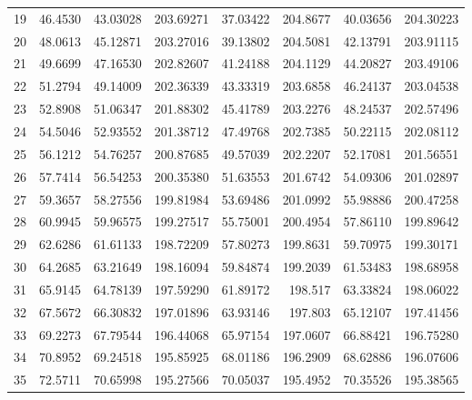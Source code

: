 \begin{table}[ht!]
{\begin{tabular}{@{}rrrrrrrr@{}}
19 & 46.4530 & 43.03028 & 203.69271 & 37.03422 & 204.8677 & 40.03656 & 204.30223 \\
20 & 48.0613 & 45.12871 & 203.27016 & 39.13802 & 204.5081 & 42.13791 & 203.91115 \\
21 & 49.6699 & 47.16530 & 202.82607 & 41.24188 & 204.1129 & 44.20827 & 203.49106 \\
22 & 51.2794 & 49.14009 & 202.36339 & 43.33319 & 203.6858 & 46.24137 & 203.04538 \\
23 & 52.8908 & 51.06347 & 201.88302 & 45.41789 & 203.2276 & 48.24537 & 202.57496 \\
24 & 54.5046 & 52.93552 & 201.38712 & 47.49768 & 202.7385 & 50.22115 & 202.08112 \\
25 & 56.1212 & 54.76257 & 200.87685 & 49.57039 & 202.2207 & 52.17081 & 201.56551 \\
26 & 57.7414 & 56.54253 & 200.35380 & 51.63553 & 201.6742 & 54.09306 & 201.02897 \\
27 & 59.3657 & 58.27556 & 199.81984 & 53.69486 & 201.0992 & 55.98886 & 200.47258 \\
28 & 60.9945 & 59.96575 & 199.27517 & 55.75001 & 200.4954 & 57.86110 & 199.89642 \\
29 & 62.6286 & 61.61133 & 198.72209 & 57.80273 & 199.8631 & 59.70975 & 199.30171 \\
30 & 64.2685 & 63.21649 & 198.16094 & 59.84874 & 199.2039 & 61.53483 & 198.68958 \\
31 & 65.9145 & 64.78139 & 197.59290 & 61.89172 & 198.517  & 63.33824 & 198.06022 \\
32 & 67.5672 & 66.30832 & 197.01896 & 63.93146 & 197.803  & 65.12107 & 197.41456 \\
33 & 69.2273 & 67.79544 & 196.44068 & 65.97154 & 197.0607 & 66.88421 & 196.75280 \\
34 & 70.8952 & 69.24518 & 195.85925 & 68.01186 & 196.2909 & 68.62886 & 196.07606 \\
35 & 72.5711 & 70.65998 & 195.27566 & 70.05037 & 195.4952 & 70.35526 & 195.38565 \\ \bottomrule
\end{tabular}%
}
\end{table}
\vfill
\clearpage

